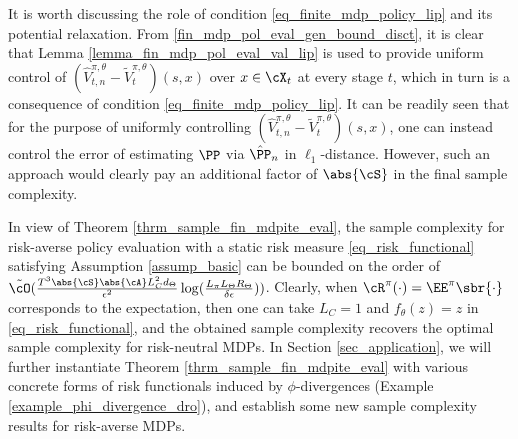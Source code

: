\documentclass[9pt]{article}
\numberwithin{equation}{section}
\renewcommand{\frac}[2]{\tfrac{#1}{#2}}
\begin{document}
\begin{remark}\label{remark_lipschitz_policy}
It is worth discussing the role of condition \eqref{eq_finite_mdp_policy_lip} and its potential relaxation. 
From \eqref{fin_mdp_pol_eval_gen_bound_disct}, it is clear that Lemma \ref{lemma_fin_mdp_pol_eval_val_lip} is used to provide uniform control of $(\hat{V}_{t,n}^{\pi, \theta} - \tilde{V}_{t}^{\pi, \theta})(s,x)$ over $x \in \cX_t$ at every stage $t$, which in turn is a  consequence of condition \eqref{eq_finite_mdp_policy_lip}. 
It can be readily seen that for the purpose of uniformly controlling $(\hat{V}_{t,n}^{\pi, \theta} - \tilde{V}_{t}^{\pi, \theta})(s,x)$, one can instead control the error of estimating $\PP$ via $\hat{\PP}_n$ in $\ell_1$-distance. 
However, such an approach would clearly pay an additional factor of $\abs{\cS}$ in the final sample complexity.  
\end{remark}

In view of Theorem \ref{thrm_sample_fin_mdpite_eval}, the sample complexity for risk-averse policy evaluation with a static risk measure \eqref{eq_risk_functional} satisfying Assumption \ref{assump_basic} can be bounded on the order of 
$\tilde{\cO}(\frac{T^3  \abs{\cS} \abs{\cA} L_C^2 d_\Theta}{\epsilon^2} \log(\tfrac{L_\pi L_\Theta R_\Theta}{\delta \epsilon}))$.
Clearly, when $\cR^\pi (\cdot) = \EE^\pi \sbr{\cdot}$ corresponds to the expectation,  then one can take $L_C = 1$ and $f_\theta (z) = z$ in \eqref{eq_risk_functional}, and the obtained sample complexity recovers the optimal sample complexity for risk-neutral MDPs. 
In Section \ref{sec_application}, we will further instantiate Theorem \ref{thrm_sample_fin_mdpite_eval} with various concrete forms of risk functionals induced by $\phi$-divergences (Example \ref{example_phi_divergence_dro}), and establish some new sample complexity results for risk-averse MDPs.
\end{document}
